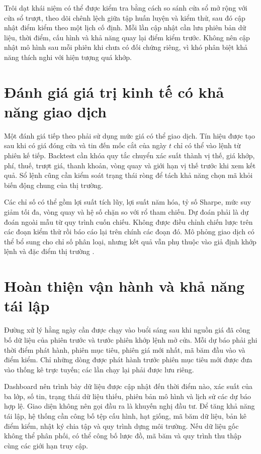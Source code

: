 \documentclass[12pt, a4paper, oneside]{report}
\begin{document}
Trôi dạt khái niệm có thể được kiểm tra bằng cách so sánh cửa sổ mở rộng với cửa sổ
trượt, theo dõi chênh lệch giữa tập huấn luyện và kiểm thử, sau đó cập nhật điểm kiểm
theo một lịch cố định. Mỗi lần cập nhật cần lưu phiên bản dữ liệu, thời điểm, cấu hình
và khả năng quay lại điểm kiểm trước. Không nên cập nhật mô hình sau mỗi phiên khi chưa
có đối chứng riêng, vì khó phân biệt khả năng thích nghi với hiện tượng quá khớp.

\section{Đánh giá giá trị kinh tế có khả năng giao dịch}

Một đánh giá tiếp theo phải sử dụng mức giá có thể giao dịch. Tín hiệu được tạo sau khi
có giá đóng cửa và tin đến mốc cắt của ngày $t$ chỉ có thể vào lệnh từ phiên kế tiếp.
Backtest cần khóa quy tắc chuyển xác suất thành vị thế, giá khớp, phí, thuế, trượt giá,
thanh khoản, vòng quay và giới hạn vị thế trước khi xem kết quả. Sổ lệnh cũng cần kiểm
soát trạng thái ròng để tách khả năng chọn mã khỏi biến động chung của thị trường.

Các chỉ số có thể gồm lợi suất tích lũy, lợi suất năm hóa, tỷ số Sharpe, mức suy giảm
tối đa, vòng quay và hệ số chặn so với rổ tham chiếu. Dự đoán phải là dự đoán ngoài mẫu
từ quy trình cuốn chiếu. Không được điều chỉnh chiến lược trên các đoạn kiểm thử rồi
báo cáo lại trên chính các đoạn đó. Mô phỏng giao dịch có thể bổ sung cho chỉ số phân
loại, nhưng kết quả vẫn phụ thuộc vào giả định khớp lệnh và đặc điểm thị trường
\cite{Chen2021_210708721v1,Feng2018_181009936v2}.

\section{Hoàn thiện vận hành và khả năng tái lập}

Đường xử lý hằng ngày cần được chạy vào buổi sáng sau khi nguồn giá đã công bố dữ liệu
của phiên trước và trước phiên khớp lệnh mở cửa. Mỗi dự báo phải ghi thời điểm phát hành,
phiên mục tiêu, phiên giá mới nhất, mã băm đầu vào và điểm kiểm. Chỉ những dòng được phát
hành trước phiên mục tiêu mới được đưa vào thống kê trực tuyến; các lần chạy lại phải
được lưu riêng.

Dashboard nên trình bày dữ liệu được cập nhật đến thời điểm nào, xác suất của ba lớp,
số tin, trạng thái dữ liệu thiếu, phiên bản mô hình và lịch sử các dự báo hợp lệ. Giao
diện không nên gọi đầu ra là khuyến nghị đầu tư. Để tăng khả năng tái lập, hệ thống cần
công bố tệp cấu hình, hạt giống, mã băm dữ liệu, bản kê điểm kiểm, nhật ký chia tập và
quy trình dựng môi trường. Nếu dữ liệu gốc không thể phân phối, có thể công bố lược đồ,
mã băm và quy trình thu thập cùng các giới hạn truy cập.
\end{document}
